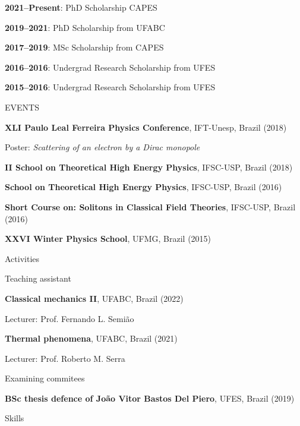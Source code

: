 \documentclass[11pt]{article}
\newcommand{\linesep}{\vspace*{1em}}
\newcommand{\MySection}[1]{
    \vspace*{2em}
    {\fontfamily{cmbr} \large \color{Indigo} \uppercase{#1} \hrulefill} \par
    \vspace*{1em}
}
\newcommand{\MySubSec}[1]{
    \vspace*{0.25em}
    {\fontfamily{cmbr} \color{Indigo} \selectfont #1} \par
    \vspace*{0.25em}
}
\newcommand{\GrantItem}[2]{
    \textbf{#1}: #2 \par
}
\newcommand{\EventItem}[5]{
    \textbf{#1}, #2, #3 (#4) \par
    {\small #5} \par
}
\newcommand{\ActivItem}[3]{
    {\small
    \quad \textbf{#1}, #2 \par
    \quad #3} \par
}
\begin{document}
\GrantItem{2021--Present}{PhD Scholarship CAPES}

\GrantItem{2019--2021}{PhD Scholarship from UFABC}

\GrantItem{2017--2019}{MSc Scholarship from CAPES}

\GrantItem{2016--2016}{Undergrad Research Scholarship from UFES}

\GrantItem{2015--2016}{Undergrad Research Scholarship from UFES}

\MySection{Events}

\EventItem{XLI Paulo Leal Ferreira Physics Conference}
{IFT-Unesp}
{Brazil}
{2018}
{\quad Poster: \emph{Scattering of an electron by a Dirac monopole}}

\linesep

\EventItem{II School on Theoretical High Energy Physics}
{IFSC-USP}
{Brazil}
{2018}

\linesep

\EventItem{School on Theoretical High Energy Physics}
{IFSC-USP}
{Brazil}
{2016}

\linesep

\EventItem{Short Course on: Solitons in Classical Field Theories}
{IFSC-USP}
{Brazil}
{2016}

\linesep

\EventItem{XXVI Winter Physics School}
{UFMG}
{Brazil}
{2015}

\MySection{Activities}

\MySubSec{Teaching assistant}

\ActivItem{Classical mechanics II}
{UFABC, Brazil (2022)}
{Lecturer: Prof. Fernando L. Semião}

\ActivItem{Thermal phenomena}
{UFABC, Brazil (2021)}
{Lecturer: Prof. Roberto M. Serra}

\linesep

\MySubSec{Examining commitees}

\ActivItem{BSc thesis defence of João Vitor Bastos Del Piero}
{UFES, Brazil (2019)}

\MySection{Skills}
\end{document}
